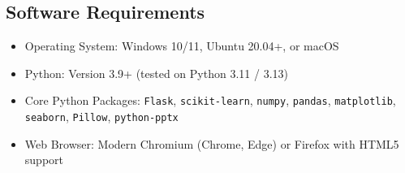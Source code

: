 \documentclass[12pt,a4paper]{article}
\begin{document}
\subsection*{Software Requirements}
\begin{itemize}
    \item Operating System: Windows 10/11, Ubuntu 20.04+, or macOS
    \item Python: Version 3.9+ (tested on Python 3.11 / 3.13)
    \item Core Python Packages: \texttt{Flask}, \texttt{scikit-learn}, \texttt{numpy}, \texttt{pandas}, \texttt{matplotlib}, \texttt{seaborn}, \texttt{Pillow}, \texttt{python-pptx}
    \item Web Browser: Modern Chromium (Chrome, Edge) or Firefox with HTML5 support
\end{itemize}
\end{document}
